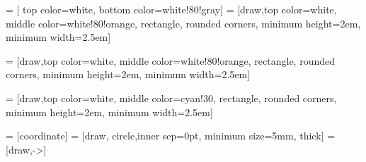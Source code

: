  = [ top color=white, bottom color=white!80!gray]
 = [draw,top color=white, middle color=white!80!orange, rectangle, rounded corners,
minimum height=2em, minimum width=2.5em]

 = [draw,top color=white, middle color=white!80!orange, rectangle, rounded corners,
minimum height=2em, minimum width=2.5em]

 = [draw,top color=white, middle color=cyan!30, rectangle, rounded corners,
minimum height=2em, minimum width=2.5em]


 = [coordinate]
 = [draw, circle,inner sep=0pt, minimum size=5mm,  thick]
=[draw,->]

